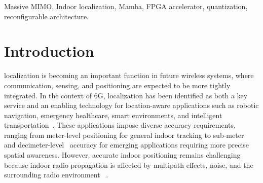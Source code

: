 \documentclass[lettersize,journal]{IEEEtran}
\begin{document}
\begin{abstract}
Using real-world massive MIMO measurements from the LuViRA dataset~\cite{LuViRA2024}, we present a system-level solution combining Mamba-based model development and hardware acceleration for indoor localization. 
Three Mamba-based models are explored: the original Mamba architecture, CMamba, a channel-correlation-enhanced state-space model designed to exploit correlations across input channels, and our proposed Slim-Mamba. Hardware implementation and bottleneck analysis are then used to guide further model simplification and optimization. The resulting Slim-Mamba  simplifies the original Mamba selective state-space block into a lightweight gated recurrent update, preserving temporal state modelling and output gating while reducing the complexity of the selective-scan computation.
The deployed model contains 816k trainable parameters and has a model size
of 3.40\,MB under FP32 precision while maintaining high localization accuracy. The corresponding accelerator provides a reconfigurable architecture with a highly parallel MAC array optimized for matrix-vector operations and fine-grained pipelining, improving resource utilization and reducing inference latency. The hardware-aware fixed-point model achieves a mean localization error of 0.14\,m, closely matching the floating-point baseline. Implemented on a Zynq UltraScale+ ZCU102 FPGA, the four-block backbone has an estimated serial latency of 212.04\,\(\mu\)s per token at 100\,MHz.
\end{abstract}

\begin{IEEEkeywords}
Massive MIMO, Indoor localization, Mamba, FPGA accelerator, quantization, reconfigurable architecture.
\end{IEEEkeywords}

\section{Introduction}
 localization is becoming an important function in future wireless systems,
where communication, sensing, and positioning are expected to be more tightly
integrated. In the context of 6G, localization has been identified as both a key
service and an enabling technology for location-aware applications such as robotic
navigation, emergency healthcare, smart environments, and intelligent
transportation~\cite{Trevlakis2023}. These applications impose diverse accuracy requirements, ranging from meter-level positioning for general indoor tracking to sub-meter~\cite{Xiang2019Submeter} and
decimeter-level~\cite{Shi2023RTPhase} accuracy for emerging applications requiring more precise
spatial awareness. However, accurate indoor positioning
remains challenging because indoor radio propagation is affected by multipath
effects, noise, and the surrounding radio environment
~\cite{Zafari2019Indoor}.
\end{document}

